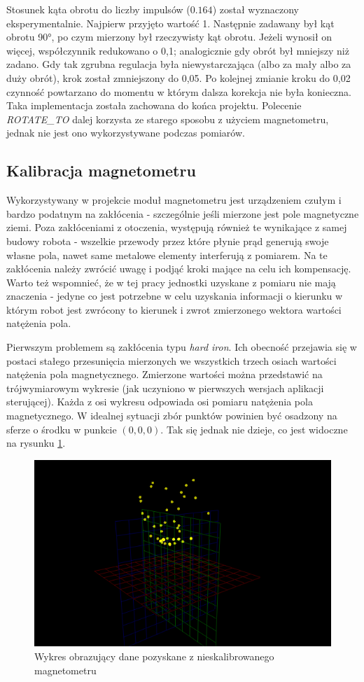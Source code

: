 Stosunek kąta obrotu do liczby impulsów ($0.164$) został wyznaczony eksperymentalnie. Najpierw przyjęto wartość 1. Następnie zadawany był kąt obrotu 90°, po czym mierzony był rzeczywisty kąt obrotu. Jeżeli wynosił on więcej, współczynnik redukowano o 0,1; analogicznie gdy obrót był mniejszy niż zadano. Gdy tak zgrubna regulacja była niewystarczająca (albo za mały albo za duży obrót), krok został zmniejszony do 0,05. Po kolejnej zmianie kroku do 0,02 czynność powtarzano do momentu w którym dalsza korekcja nie była konieczna. \\

Taka implementacja została zachowana do końca projektu. Polecenie \emph{ROTATE\_TO} dalej korzysta ze starego sposobu z użyciem magnetometru, jednak nie jest ono wykorzystywane podczas pomiarów.

\subsection{Kalibracja magnetometru}
\label{sec:mag-cal}
Wykorzystywany w projekcie moduł magnetometru jest urządzeniem czułym i bardzo podatnym na zakłócenia - szczególnie jeśli mierzone jest pole magnetyczne ziemi. Poza zakłóceniami z otoczenia, występują również te wynikające z samej budowy robota - wszelkie przewody przez które płynie prąd generują swoje własne pola, nawet same metalowe elementy interferują z pomiarem. Na te zakłócenia należy zwrócić uwagę i podjąć kroki mające na celu ich kompensację. Warto też wspomnieć, że w tej pracy jednostki uzyskane z pomiaru nie mają znaczenia - jedyne co jest potrzebne w celu uzyskania informacji o kierunku w którym robot jest zwrócony to kierunek i zwrot zmierzonego wektora wartości natężenia pola.

Pierwszym problemem są zakłócenia typu \emph{hard iron}. Ich obecność przejawia się w postaci stałego przesunięcia mierzonych we wszystkich trzech osiach wartości natężenia pola magnetycznego. Zmierzone wartości można przedstawić na trójwymiarowym wykresie (jak uczyniono w pierwszych wersjach aplikacji sterującej). Każda z osi wykresu odpowiada osi pomiaru natężenia pola magnetycznego. W idealnej sytuacji zbór punktów powinien być osadzony na sferze o środku w punkcie $(0,0,0)$. Tak się jednak nie dzieje, co jest widoczne na rysunku \ref{fig:3d-mag-no-cal}.

\begin{figure}[ht]
	\centering
		\includegraphics[width=0.6\linewidth]{rys/ScanBot-03-magnetometer-3d-decalibrated.PNG}
	\caption{Wykres obrazujący dane pozyskane z nieskalibrowanego magnetometru}
	\label{fig:3d-mag-no-cal}
\end{figure}


